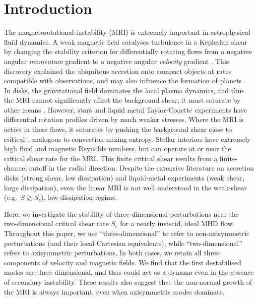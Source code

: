\documentclass[openacc]{rsproca_new}%
\begin{document}
\maketitle

\section{Introduction}
The magnetorotational instability (MRI) is extremely important in astrophysical fluid dynamics.
A weak magnetic field catalyses turbulence in a Keplerian shear by changing the stability criterion for differentially rotating flows from a negative angular \emph{momentum} gradient to a negative angular \emph{velocity} gradient \cite{1998RvMP...70....1B,2010RSPTA.368.1607J}.
This discovery explained the ubiquitous accretion onto compact objects at rates compatible with observations, and may also influence the formation of planets \cite{2007Natur.448.1022J}.
In disks, the gravitational field dominates the local plasma dynamics, and thus the MRI cannot significantly affect the background shear; it must saturate by other means \cite{2018MNRAS.474.3451X}.
However, stars and liquid metal Taylor-Couette experiments have differential rotation profiles driven by much weaker stresses.
Where the MRI is active in these flows, it saturates by pushing the background shear close to critical \cite{2015RSPSA.47140699V,2017ApJ...841....1C,2017ApJ...841....2C}, analogous to convection mixing entropy.
Stellar interiors have extremely high fluid and magnetic Reynolds numbers, but can operate at or near the critical shear rate for the MRI.
This finite critical shear results from a finite-channel cutoff in the radial direction.
Despite the extensive literature on accretion disks (strong shear, low dissipation) and liquid-metal experiments (weak shear, large dissipation), even the linear MRI is not well understood in the weak-shear (e.g.\ $S \gtrsim S_c$), low-dissipation regime. 

Here, we investigate the stability of three-dimensional perturbations near the two-dimensional critical shear rate $S_{c}$ for a nearly inviscid, ideal MHD flow.
Throughout this paper, we use ``three-dimensional'' to refer to non-axisymmetric perturbations (and their local Cartesian equivalents), while ``two-dimensional'' refers to axisymmetric perturbations.
In both cases, we retain all three components of velocity and magnetic fields.
We find that the first destabilised modes are three-dimensional, and thus could act as a dynamo even in the absence of secondary instability.
These results also suggest that the non-normal growth of the MRI is always important, even when axisymmetric modes dominate.
\end{document}
